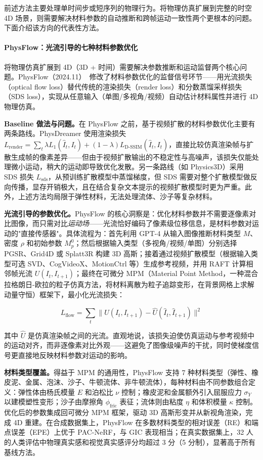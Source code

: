 前述方法主要处理单时间步或短序列的物理行为。将物理仿真扩展到完整的时空 4D 场景，则需要解决材料参数的自动推断和跨帧运动一致性两个更根本的问题。下面介绍该方向的代表性方法。

\paragraph{PhysFlow：光流引导的七种材料参数优化}

将物理仿真扩展到 4D（3D + 时间）需要解决参数推断和运动监督两个核心问题。PhysFlow（2024.11）~\cite{2411_14423}修改了材料参数优化的监督信号环节——用光流损失（optical flow loss）替代传统的渲染损失（render loss）和分数蒸馏采样损失（SDS loss），实现从任意输入（单图/多视角/视频）自动估计材料属性并进行 4D 物理仿真。

\textbf{Baseline 做法与问题。}在 PhysFlow 之前，基于视频扩散的材料参数优化主要有两条路线。PhysDreamer 使用渲染损失 $L_{\text{render}} = \sum_t \lambda L_1(\hat{I}_t, I_t) + (1-\lambda)L_{\text{D-SSIM}}(\hat{I}_t, I_t)$，直接比较仿真渲染帧与扩散生成帧的像素差异——但由于视频扩散输出的不稳定性与高噪声，该损失仅能处理微小运动，稍大的运动即导致优化发散。另一条路线（如 Physics3D）采用 SDS 损失 $L_{\text{sds}}$，从预训练扩散模型中蒸馏梯度，但 SDS 需要对整个扩散模型做反向传播，显存开销极大，且在结合复杂文本提示的视频扩散模型时更为严重。此外，上述方法均局限于弹性材料，无法处理流体、沙子等复杂材料。

\textbf{光流引导的参数优化。}PhysFlow 的核心洞察是：优化材料参数并不需要逐像素对比图像，而只需对比\emph{运动场}——光流恰好编码了像素级位移信息，是材料参数对运动的"直接传感器"。具体流程为：首先利用 GPT-4 从输入图像推断材料类型 $M$、密度 $\rho$ 和初始参数 $M_p^0$；然后根据输入类型（多视角/视频/单图）分别选择 PGSR、Grid4D 或 Splatt3R 构建 3D 高斯；接着通过视频扩散模型（根据输入类型可选 SVD、CogVideoX、MotionCtrl 等）生成参考视频，并用 RAFT 计算相邻帧光流 $U(I_t, I_{t+1})$；最终在可微分 MPM（Material Point Method，一种混合拉格朗日-欧拉的粒子仿真方法，将材料离散为粒子追踪变形，在背景网格上求解动量守恒）框架下，最小化光流损失：

\begin{equation}
    L_{\text{flow}} = \sum_t \|U(I_t, I_{t+1}) - \hat{U}(\hat{I}_t, \hat{I}_{t+1})\|^2
\end{equation}

其中 $\hat{U}$ 是仿真渲染帧之间的光流。直观地说，该损失迫使仿真运动与参考视频中的运动对齐，而非逐像素对比外观——这避免了图像级噪声的干扰，同时使梯度信号更直接地反映材料参数对运动的影响。

\textbf{材料类型覆盖。}得益于 MPM 的通用性，PhysFlow 支持 7 种材料类型（弹性、橡皮泥、金属、泡沫、沙子、牛顿流体、非牛顿流体），每种材料由不同参数组合定义：弹性体由杨氏模量 $E$ 和泊松比 $\nu$ 控制；橡皮泥和金属额外引入屈服应力 $\sigma_Y$ 以建模塑性变形；沙子由摩擦角 $\phi_{\text{fric}}$ 表征；流体则由粘度 $\eta$ 和体积模量 $\kappa$ 控制。优化后的参数集成回可微分 MPM 框架，驱动 3D 高斯形变并从新视角渲染，完成 4D 重建。在合成数据集上，PhysFlow 在多数材料类型的相对误差（RE）和端点误差（EPE）上优于 PAC-NeRF，与 GIC 表现相当；在真实数据集上，32 人的人类评估中物理真实感和视觉真实感评分均超过 3 分（5 分制），显著高于所有基线方法。

